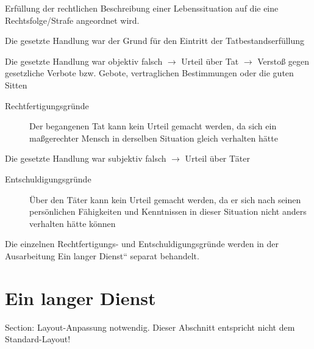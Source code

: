 {
Erf\"ullung der rechtlichen Beschreibung einer Lebenssituation auf die
eine Rechtsfolge/Strafe angeordnet wird.
}{}{}{}{}


{

Die gesetzte Handlung war der Grund f\"ur den Eintritt der
Tatbestandserf\"ullung
}{}{}{}{}


{
Die gesetzte Handlung war objektiv falsch ${\rightarrow}$ Urteil \"uber
Tat ${\rightarrow}$ Versto{\ss} gegen gesetzliche Verbote bzw. Gebote,
vertraglichen Bestimmungen oder die guten Sitten


\begin{description}
    \item[Rechtfertigungsgr\"unde]  Der begangenen Tat kann kein Urteil gemacht werden, da sich ein
    ma{\ss}gerechter Mensch in  derselben Situation gleich verhalten
    hätte
\end{description}
}{}{}{}{}


{
Die gesetzte Handlung war subjektiv falsch ${\rightarrow}$ Urteil \"uber
Täter

\begin{description}
    \item[Entschuldigungsgr\"unde] \"Uber den Täter kann kein Urteil gemacht werden, da er sich nach
    seinen pers\"onlichen   Fähigkeiten und Kenntnissen in dieser
    Situation nicht anders verhalten hätte k\"onnen
\end{description}



Die einzelnen Rechtfertigungs- und Entschuldigungsgr\"unde werden in der
Ausarbeitung {\quotedblbase}Ein langer Dienst{\textquotedblleft}
separat behandelt.
}{}{}{}{}





\clearpage

\section{Ein langer Dienst}
\begin{anfxwarning}[author=GABS]{Section: Layout-Anpassung notwendig.}
Dieser Abschnitt entspricht nicht dem Standard-Layout!
\end{anfxwarning}

{\centering
{}
\par}

